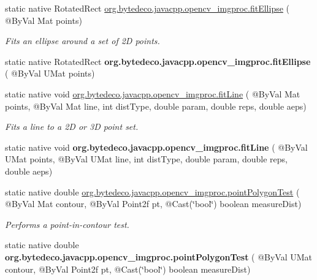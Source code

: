 \begin{DoxyCompactItemize}
\item 
static native Rotated\+Rect \hyperlink{group__imgproc__shape_ga4e705f42eefa1224c87285653b6fb44d}{org.\+bytedeco.\+javacpp.\+opencv\+\_\+imgproc.\+fit\+Ellipse} ( @By\+Val Mat points)
\begin{DoxyCompactList}\small\item\em Fits an ellipse around a set of 2D points. \end{DoxyCompactList}\item 
\mbox{\label{group__imgproc__shape_ga4e86533eab74a1f956cd1db026edf8ed}} 
static native Rotated\+Rect {\bfseries org.\+bytedeco.\+javacpp.\+opencv\+\_\+imgproc.\+fit\+Ellipse} ( @By\+Val U\+Mat points)
\item 
static native void \hyperlink{group__imgproc__shape_ga081f0e410b01a81bbfe62c828ebb3c6f}{org.\+bytedeco.\+javacpp.\+opencv\+\_\+imgproc.\+fit\+Line} ( @By\+Val Mat points, @By\+Val Mat line, int dist\+Type, double param, double reps, double aeps)
\begin{DoxyCompactList}\small\item\em Fits a line to a 2D or 3D point set. \end{DoxyCompactList}\item 
\mbox{\label{group__imgproc__shape_ga6833c0216cb9d8be1efa71dbbd31db72}} 
static native void {\bfseries org.\+bytedeco.\+javacpp.\+opencv\+\_\+imgproc.\+fit\+Line} ( @By\+Val U\+Mat points, @By\+Val U\+Mat line, int dist\+Type, double param, double reps, double aeps)
\item 
static native double \hyperlink{group__imgproc__shape_gaf6f02003be04d7a37eff3af25946ff77}{org.\+bytedeco.\+javacpp.\+opencv\+\_\+imgproc.\+point\+Polygon\+Test} ( @By\+Val Mat contour, @By\+Val Point2f pt, @Cast(\char`\"{}bool\char`\"{}) boolean measure\+Dist)
\begin{DoxyCompactList}\small\item\em Performs a point-\/in-\/contour test. \end{DoxyCompactList}\item 
\mbox{\label{group__imgproc__shape_gab9b42bbdf409f7a8080d8fd2330dc8df}} 
static native double {\bfseries org.\+bytedeco.\+javacpp.\+opencv\+\_\+imgproc.\+point\+Polygon\+Test} ( @By\+Val U\+Mat contour, @By\+Val Point2f pt, @Cast(\char`\"{}bool\char`\"{}) boolean measure\+Dist)
\item 

\end{DoxyCompactItemize}
